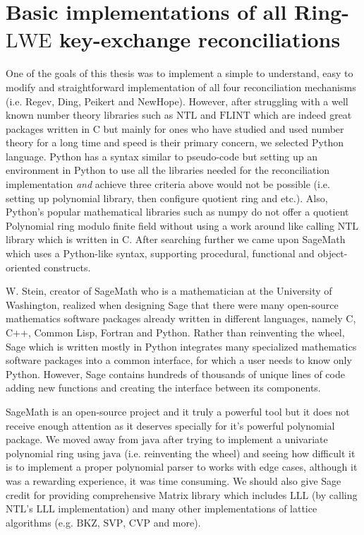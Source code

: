 \chapter{Basic implementations of all Ring-\texorpdfstring{$\mathrm{LWE}$}{LWE} key-exchange reconciliations}

One of the goals of this thesis was to implement a simple to understand, easy to modify and straightforward implementation of all four reconciliation mechanisms (i.e. Regev, Ding, Peikert and NewHope). However, after struggling with a well known number theory libraries such as $\mathrm{NTL}$ and $\mathrm{FLINT}$ which are indeed great packages written in $\mathrm{C}$ but mainly for ones who have studied and used number theory for a long time and speed is their primary concern, we selected Python language. Python has a syntax similar to pseudo-code but setting up an environment in Python to use all the libraries needed for the reconciliation implementation \textit{and} achieve three criteria above would not be possible (i.e. setting up polynomial library, then configure quotient ring and etc.). Also, Python's popular mathematical libraries such as $\mathrm{numpy}$ do not offer a quotient Polynomial ring modulo finite field without using a work around like calling $\mathrm{NTL}$ library which is written in $\mathrm{C}$. After searching further we came upon SageMath which uses a Python-like syntax, supporting procedural, functional and object-oriented constructs.

W. Stein, creator of SageMath who is a mathematician at the University of Washington, realized when designing Sage that there were many open-source mathematics software packages already written in different languages, namely $\mathrm{C}$, $\mathrm{C}$++, Common Lisp, Fortran and Python. Rather than reinventing the wheel, Sage which is written mostly in Python integrates many specialized mathematics software packages into a common interface, for which a user needs to know only Python. However, Sage contains hundreds of thousands of unique lines of code adding new functions and creating the interface between its components.

SageMath is an open-source project and it truly a powerful tool but it does not receive enough attention as it deserves specially for it's powerful polynomial package. We moved away from $\mathrm{java}$ after trying to implement a univariate polynomial ring using $\mathrm{java}$ (i.e. reinventing the wheel) and seeing how difficult it is to implement a proper polynomial parser to works with edge cases, although it was a rewarding experience, it was time consuming. We should also give Sage credit for providing comprehensive Matrix library which includes $\mathrm{LLL}$ (by calling $\mathrm{NTL}$'s $\mathrm{LLL}$ implementation) and many other implementations of lattice algorithms (e.g. $\mathrm{BKZ}$, $\mathrm{SVP}$, $\mathrm{CVP}$ and more).

